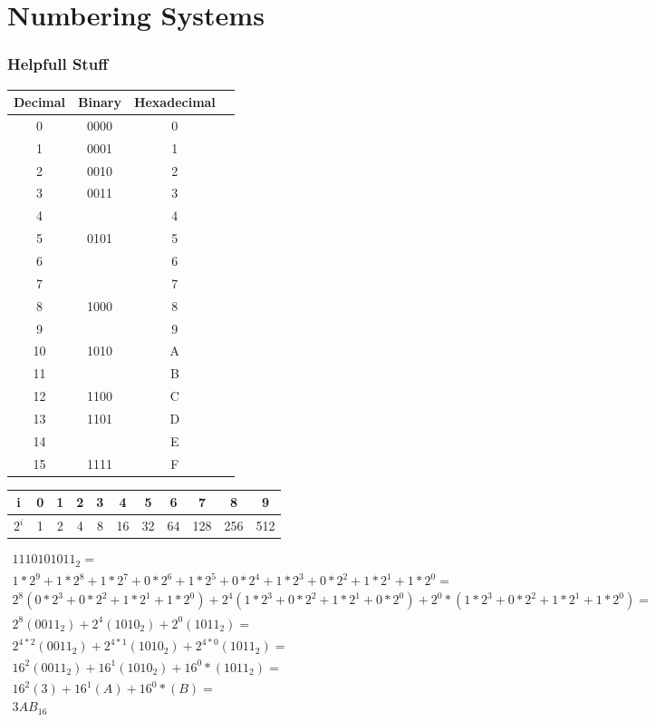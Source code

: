 \chapter{Numbering Systems}
\label{chapter:NumberingSystems}
\graphicspath{ {./chapter01/Fig} }

\subsection{Helpfull Stuff}

\begin{tabular}{|c|c|c|c|}\hline
Decimal & Binary & Hexadecimal \\ \hline
0	& 0000	& 0	 \\ \hline
1	& 0001	& 1	 \\ \hline
2	& 0010	& 2	 \\ \hline
3	& 0011	& 3	 \\ \hline
4	& 		& 4	 \\ \hline
5	& 0101	& 5	 \\ \hline
6	& 		& 6	 \\ \hline
7	& 		& 7	 \\ \hline
8	& 1000	& 8	 \\ \hline
9	& 		& 9	 \\ \hline
10	& 1010	& A	 \\ \hline
11	& 		& B	 \\ \hline
12	& 1100	& C	 \\ \hline
13	& 1101	& D	 \\ \hline
14	& 		& E	 \\ \hline
15	& 1111	& F	 \\ \hline
\end{tabular}
\vspace{0.5in}

\begin{tabular}{|c|c|c|c|c|c|c|c|c|c|c|}\hline
i    & 0 & 1 &  2 &  3 &  4 &  5 &  6 &  7  &  8  &  9  \\ \hline
$2^i$ & 1 & 2 &  4 &  8 & 16 & 32 & 64 & 128 & 256 &  512\\ \hline
\end{tabular}
\vspace{0.5in}

{\tiny
$\begin{array}{l}
1110101011_2= \\
1*2^9+1*2^8+1*2^7+0*2^6+1*2^5+0*2^4+1*2^3+0*2^2+1*2^1+1*2^0 = \\
2^8(0*2^3+0*2^2+1*2^1+1*2^0) + 2^4(1*2^3+0*2^2+1*2^1+0*2^0) + 2^0*(1*2^3+0*2^2+1*2^1+1*2^0) =\\
2^8(0011_2) + 2^4(1010_2) +  2^0(1011_2) =\\
2^{4*2}(0011_2) + 2^{4*1}(1010_2) +  2^{4*0}(1011_2) =\\
16^2(0011_2) + 16^1(1010_2) + 16^0*(1011_2) =\\
16^2(3) + 16^1(A) + 16^0*(B) =\\
3AB_{16}
\end{array}$
}


